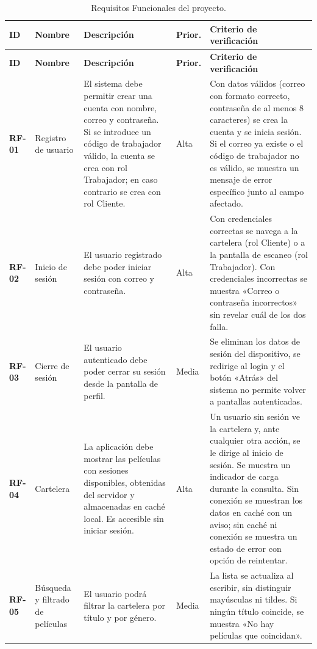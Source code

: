 \documentclass[11pt,a4paper]{article}
\begin{document}
\begin{longtable}{L{1.4cm} L{2.4cm} L{4.4cm} L{1.2cm} L{4.3cm}}
\caption{Requisitos Funcionales del proyecto.}\\
\toprule
\textbf{ID} & \textbf{Nombre} & \textbf{Descripción} & \textbf{Prior.} & \textbf{Criterio de verificación} \\
\midrule
\endfirsthead
\toprule
\textbf{ID} & \textbf{Nombre} & \textbf{Descripción} & \textbf{Prior.} & \textbf{Criterio de verificación} \\
\midrule
\endhead
\endfoot
\bottomrule
\endlastfoot

\textbf{RF-01} & Registro de usuario & El sistema debe permitir crear una cuenta con nombre, correo y contraseña. Si se introduce un código de trabajador válido, la cuenta se crea con rol Trabajador; en caso contrario se crea con rol Cliente. & Alta & Con datos válidos (correo con formato correcto, contraseña de al menos 8 caracteres) se crea la cuenta y se inicia sesión. Si el correo ya existe o el código de trabajador no es válido, se muestra un mensaje de error específico junto al campo afectado. \\
\midrule
\textbf{RF-02} & Inicio de sesión & El usuario registrado debe poder iniciar sesión con correo y contraseña. & Alta & Con credenciales correctas se navega a la cartelera (rol Cliente) o a la pantalla de escaneo (rol Trabajador). Con credenciales incorrectas se muestra «Correo o contraseña incorrectos» sin revelar cuál de los dos falla. \\
\midrule
\textbf{RF-03} & Cierre de sesión & El usuario autenticado debe poder cerrar su sesión desde la pantalla de perfil. & Media & Se eliminan los datos de sesión del dispositivo, se redirige al login y el botón «Atrás» del sistema no permite volver a pantallas autenticadas. \\
\midrule
\textbf{RF-04} & Cartelera & La aplicación debe mostrar las películas con sesiones disponibles, obtenidas del servidor y almacenadas en caché local. Es accesible sin iniciar sesión. & Alta & Un usuario sin sesión ve la cartelera y, ante cualquier otra acción, se le dirige al inicio de sesión. Se muestra un indicador de carga durante la consulta. Sin conexión se muestran los datos en caché con un aviso; sin caché ni conexión se muestra un estado de error con opción de reintentar. \\
\midrule
\textbf{RF-05} & Búsqueda y filtrado de películas & El usuario podrá filtrar la cartelera por título y por género. & Media & La lista se actualiza al escribir, sin distinguir mayúsculas ni tildes. Si ningún título coincide, se muestra «No hay películas que coincidan». \\

\end{longtable}
\end{document}
